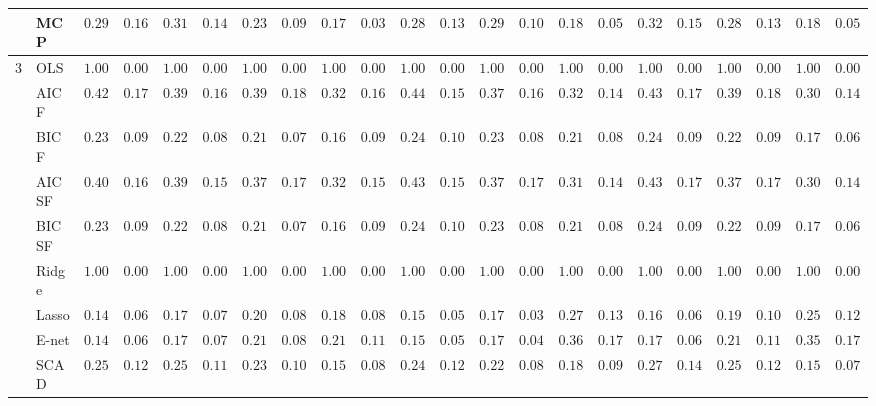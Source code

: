 \begin{tabular}{p{0.2cm}p{1cm}|p{0.6cm}p{0.6cm}|p{0.6cm}p{0.6cm}p{0.6cm}p{0.6cm}p{0.6cm}p{0.6cm}|p{0.6cm}p{0.6cm}p{0.6cm}p{0.6cm}p{0.6cm}p{0.6cm}|p{0.6cm}p{0.6cm}p{0.6cm}p{0.6cm}p{0.6cm}p{0.6cm}}
 & MCP  & $0.2983$ & $0.1680$ & $0.3100$ & $0.1461$ & $0.2300$ & $0.0999$ & $0.1750$ & $0.0365$ & $0.2867$ & $0.1383$ & $0.2917$ & $0.1095$ & $0.1867$ & $0.0594$ & $0.3250$ & $0.1542$ & $0.2833$ & $0.1330$ & $0.1800$ & $0.0512$ \\\hline
3 & OLS  & $1.0000$ & $0.0000$ & $1.0000$ & $0.0000$ & $1.0000$ & $0.0000$ & $1.0000$ & $0.0000$ & $1.0000$ & $0.0000$ & $1.0000$ & $0.0000$ & $1.0000$ & $0.0000$ & $1.0000$ & $0.0000$ & $1.0000$ & $0.0000$ & $1.0000$ & $0.0000$ \\
 & AIC F  & $0.4283$ & $0.1761$ & $0.3967$ & $0.1637$ & $0.3983$ & $0.1864$ & $0.3250$ & $0.1648$ & $0.4417$ & $0.1578$ & $0.3750$ & $0.1681$ & $0.3250$ & $0.1448$ & $0.4367$ & $0.1769$ & $0.3933$ & $0.1812$ & $0.3083$ & $0.1429$ \\
 & BIC F  & $0.2300$ & $0.0970$ & $0.2233$ & $0.0893$ & $0.2117$ & $0.0744$ & $0.1600$ & $0.0915$ & $0.2433$ & $0.1017$ & $0.2300$ & $0.0847$ & $0.2150$ & $0.0864$ & $0.2433$ & $0.0960$ & $0.2217$ & $0.0949$ & $0.1700$ & $0.0626$ \\
 & AIC SF  & $0.4083$ & $0.1630$ & $0.3900$ & $0.1539$ & $0.3783$ & $0.1722$ & $0.3200$ & $0.1583$ & $0.4367$ & $0.1549$ & $0.3750$ & $0.1714$ & $0.3117$ & $0.1415$ & $0.4383$ & $0.1751$ & $0.3783$ & $0.1786$ & $0.3000$ & $0.1421$ \\
 & BIC SF  & $0.2300$ & $0.0970$ & $0.2233$ & $0.0893$ & $0.2117$ & $0.0744$ & $0.1600$ & $0.0915$ & $0.2417$ & $0.1015$ & $0.2300$ & $0.0847$ & $0.2100$ & $0.0842$ & $0.2433$ & $0.0960$ & $0.2200$ & $0.0914$ & $0.1700$ & $0.0626$ \\
 & Ridge  & $1.0000$ & $0.0000$ & $1.0000$ & $0.0000$ & $1.0000$ & $0.0000$ & $1.0000$ & $0.0000$ & $1.0000$ & $0.0000$ & $1.0000$ & $0.0000$ & $1.0000$ & $0.0000$ & $1.0000$ & $0.0000$ & $1.0000$ & $0.0000$ & $1.0000$ & $0.0000$ \\
 & Lasso  & $0.1450$ & $0.0655$ & $0.1750$ & $0.0725$ & $0.2000$ & $0.0821$ & $0.1867$ & $0.0830$ & $0.1567$ & $0.0520$ & $0.1767$ & $0.0398$ & $0.2717$ & $0.1374$ & $0.1683$ & $0.0604$ & $0.1933$ & $0.1025$ & $0.2500$ & $0.1219$ \\
 & E-net  & $0.1450$ & $0.0655$ & $0.1750$ & $0.0725$ & $0.2100$ & $0.0874$ & $0.2183$ & $0.1103$ & $0.1567$ & $0.0520$ & $0.1783$ & $0.0427$ & $0.3667$ & $0.1725$ & $0.1700$ & $0.0669$ & $0.2150$ & $0.1191$ & $0.3533$ & $0.1745$ \\
 & SCAD  & $0.2517$ & $0.1265$ & $0.2533$ & $0.1172$ & $0.2333$ & $0.1005$ & $0.1533$ & $0.0810$ & $0.2400$ & $0.1215$ & $0.2250$ & $0.0898$ & $0.1850$ & $0.0974$ & $0.2767$ & $0.1445$ & $0.2567$ & $0.1218$ & $0.1583$ & $0.0763$ \\

\end{tabular}
